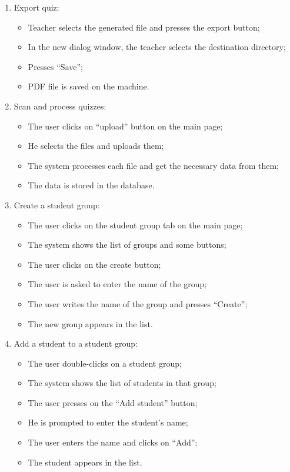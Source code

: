 \begin{enumerate}
  \item Export quiz:
  \begin{itemize}
    \item Teacher selects the generated file and presses the export button;
    \item In the new dialog window, the teacher selects the destination directory;
    \item Presses “Save”;
    \item PDF file is saved on the machine.
  \end{itemize}

  \item Scan and process quizzes:
  \begin{itemize}
    \item The user clicks on “upload” button on the main page;
    \item He selects the files and uploads them;
    \item The system processes each file and get the necessary data from them;
    \item The data is stored in the database.
  \end{itemize}

  \item Create a student group:
  \begin{itemize}
    \item The user clicks on the student group tab on the main page;
    \item The system shows the list of groups and some buttons;
    \item The user clicks on the create button;
    \item The user is asked to enter the name of the group;
    \item The user writes the name of the group and presses “Create”;
    \item The new group appears in the list.
  \end{itemize}

  \item Add a student to a student group:
  \begin{itemize}
    \item The user double-clicks on a student group;
    \item The system shows the list of students in that group;
    \item The user presses on the “Add student” button;
    \item He is prompted to enter the student’s name;
    \item The user enters the name and clicks on “Add”;
    \item The student appears in the list.
  \end{itemize}
\end{enumerate}

